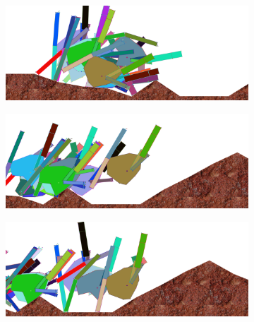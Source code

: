           \begin{figure}[H]
            \centering
            \begin{subfigure}[b]{0.45\textwidth}
              \includegraphics[width=\linewidth,center]{graphics/simulation-results/4_gen7000_1}
              \caption{\label{fig:gen7000_1}}
            \end{subfigure}
            \begin{subfigure}[b]{0.45\textwidth}
              \includegraphics[width=\linewidth,center]{graphics/simulation-results/4_gen7000_2}
              \caption{\label{fig:gen7000_2}}
            \end{subfigure}
            \begin{subfigure}[b]{0.45\textwidth}
              \includegraphics[width=\linewidth,center]{graphics/simulation-results/4_gen7000_3}
              \caption{\label{fig:gen7000_3}}
            \end{subfigure}
            \begin{subfigure}[b]{0.45\textwidth}

\end{subfigure}
\end{figure}
